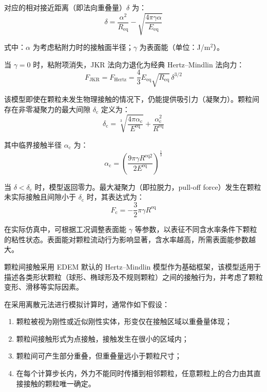 对应的相对接近距离（即法向重叠量）$\delta$ 为：
\begin{equation}
    \delta = \frac{\alpha^{2}}{R_{\mathrm{eq}}}
    - \sqrt{\frac{4\pi\gamma\alpha}{E_{\mathrm{eq}}}}
    \label{eq:JKR_overlap}
\end{equation}

式中：$\alpha$ 为考虑粘附力时的接触面半径；$\gamma$ 为表面能（单位：J/m$^{2}$）。

当 $\gamma = 0$ 时，粘附项消失，JKR 法向力退化为经典 Hertz--Mindlin 法向力：
\begin{equation}
    F_{\mathrm{JKR}} = F_{\mathrm{Hertz}}
    = \frac{4}{3}E_{\mathrm{eq}}\sqrt{R_{\mathrm{eq}}}\,\delta^{3/2}
    \label{eq:Hertz_force}
\end{equation}

该模型即使在颗粒未发生物理接触的情况下，仍能提供吸引力（凝聚力）。颗粒间存在非零凝聚力的最大间隙 $\delta_{\mathrm{c}}$ 定义为：
\begin{equation}
    \delta_{\mathrm{c}} = \sqrt[3]{\frac{4\pi\alpha_{\mathrm{c}}}{E^{\mathrm{eq}}}}
    + \frac{\alpha_{\mathrm{c}}^{2}}{R^{\mathrm{eq}}}
    \label{eq:critical_gap}
\end{equation}

其中临界接触半径 $\alpha_{\mathrm{c}}$ 为：
\begin{equation}
    \alpha_{\mathrm{c}} = \left(\frac{9\pi\gamma R^{\mathrm{eq}2}}{2E^{\mathrm{eq}}}\right)^{\frac{1}{3}}
    \label{eq:critical_radius}
\end{equation}

当 $\delta < \delta_{\mathrm{c}}$ 时，模型返回零力。最大凝聚力（即拉脱力，pull-off force）发生在颗粒未实际接触且间隙小于 $\delta_{\mathrm{c}}$ 时，其表达式为：
\begin{equation}
    F_{\mathrm{c}} = -\frac{3}{2}\pi\gamma R^{\mathrm{eq}}
    \label{eq:pull_off_force}
\end{equation}

在实际仿真中，可根据工况调整表面能 $\gamma$ 等参数，以表征不同含水率条件下颗粒的粘性状态。表面能对颗粒流动行为影响显著，含水率越高，所需表面能参数越大。

颗粒间接触采用 EDEM 默认的 Hertz--Mindlin 模型作为基础框架，该模型适用于描述各类形状颗粒（球形、椭球形及不规则颗粒）之间的接触行为，并考虑了颗粒变形、滑移等实际因素。

在采用离散元法进行模拟计算时，通常作如下假设：
\begin{enumerate}
    \item 颗粒被视为刚性或近似刚性实体，形变仅在接触区域以重叠量体现；
    \item 颗粒间接触形式为点接触，接触发生在很小的区域内；
    \item 颗粒间可产生部分重叠，但重叠量远小于颗粒尺寸；
    \item 在每个计算步长内，外力不能同时传播到相邻颗粒，任意颗粒上的合力由其直接接触的颗粒唯一确定。
\end{enumerate}

